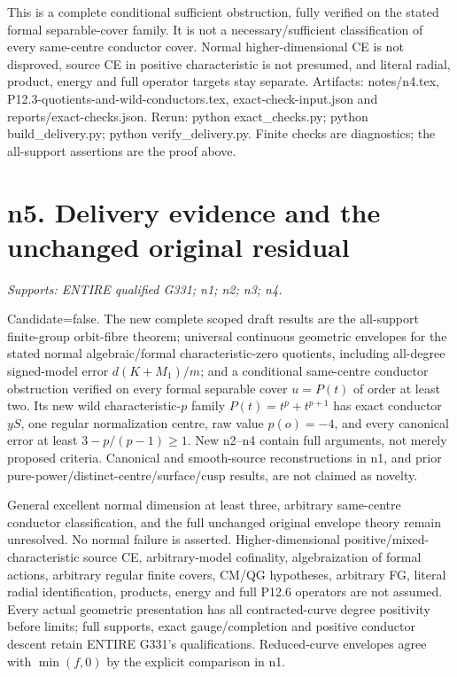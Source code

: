 \documentclass[11pt]{article}
\begin{document}
This is a complete conditional sufficient obstruction, fully verified on
the stated formal separable-cover family. It is not a necessary/sufficient
classification of every same-centre conductor cover. Normal higher-dimensional
CE is not disproved, source CE in positive characteristic is not presumed,
and literal radial, product, energy and full operator targets stay separate.
Artifacts: notes/n4.tex, P12.3-quotients-and-wild-conductors.tex,
exact-check-input.json and reports/exact-checks.json. Rerun:
python exact\_checks.py; python build\_delivery.py; python verify\_delivery.py.
Finite checks are diagnostics; the all-support assertions are the proof above.

\section{n5. Delivery evidence and the unchanged original residual}
\textit{Supports: ENTIRE qualified G331; n1; n2; n3; n4.}

Candidate=false. The new complete scoped draft results are the all-support
finite-group orbit-fibre theorem; universal continuous geometric envelopes
for the stated normal algebraic/formal characteristic-zero quotients,
including all-degree signed-model error $d(K+M_1)/m$; and a conditional
same-centre conductor obstruction verified on every formal separable cover
$u=P(t)$ of order at least two. Its new wild characteristic-$p$ family
$P(t)=t^p+t^{p+1}$ has exact conductor $yS$, one regular normalization
centre, raw value $p(o)=-4$, and every canonical error at least
$3-p/(p-1)\ge1$. New n2--n4 contain full arguments, not merely proposed
criteria. Canonical and smooth-source reconstructions in n1, and prior
pure-power/distinct-centre/surface/cusp results, are not claimed as novelty.

General excellent normal dimension at least three, arbitrary same-centre
conductor classification, and the full unchanged original envelope theory
remain unresolved. No normal failure is asserted. Higher-dimensional
positive/mixed-characteristic source CE, arbitrary-model cofinality,
algebraization of formal actions, arbitrary regular finite covers, CM/QG
hypotheses, arbitrary FG, literal radial identification, products, energy
and full P12.6 operators are not assumed. Every actual geometric
presentation has all contracted-curve degree positivity before limits;
full supports, exact gauge/completion and positive conductor descent retain
ENTIRE G331's qualifications. Reduced-curve envelopes agree with
$\min(f,0)$ by the explicit comparison in n1.
\end{document}
